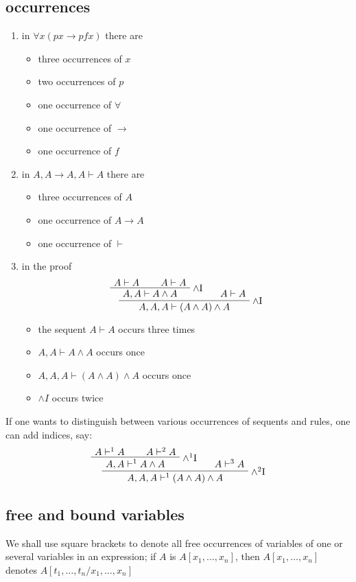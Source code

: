 \documentclass[11pt]{article}
\def \EBA {\EnableBpAbbreviations}
\def \RL[#1]{\RightLabel{#1}}
\begin{document}
\subsection{occurrences}
\label{sec:org430d477}
\begin{enumerate}
\item in \(\forall x(px\to pfx)\) there are
\begin{itemize}
\item three occurrences of \(x\)
\item two occurrences of \(p\)
\item one occurrence of \(\forall\)
\item one occurrence of \(\to\)
\item one occurrence of \(f\)
\end{itemize}
\item in \(A,A\to A,A\vdash A\) there are
\begin{itemize}
\item three occurrences of \(A\)
\item one occurrence of \(A\to A\)
\item one occurrence of \(\vdash\)
\end{itemize}
\item in the proof
\begin{gather*}
\EBA\AXC{$A\vdash A$}
\AXC{$A\vdash A$}\RL{$\wedge$I}
\BIC{$A,A\vdash A\wedge A$}
\AXC{$A\vdash A$}\RL{$\wedge$I}
\BIC{$A,A,A\vdash(A\wedge A)\wedge A$}\DP
\end{gather*}
\begin{itemize}
\item the sequent \(A\vdash A\) occurs three times
\item \(A,A\vdash A\wedge A\) occurs once
\item \(A,A,A\vdash(A\wedge A)\wedge A\) occurs once
\item \(\wedge I\) occurs twice
\end{itemize}
\end{enumerate}


If one wants to distinguish between various occurrences of sequents and rules,
one can add indices, say:
\begin{gather*}
\EBA\AXC{$A\vdash^1 A$}
\AXC{$A\vdash^2 A$}\RL{$\wedge^1$I}
\BIC{$A,A\vdash^1 A\wedge A$}
\AXC{$A\vdash^3 A$}\RL{$\wedge^2$I}
\BIC{$A,A,A\vdash^1(A\wedge A)\wedge A$}\DP
\end{gather*}
\subsection{free and bound variables}
\label{sec:orgc584d54}
We shall use square brackets to denote all free occurrences of variables of one
or several variables in an expression; if \(A\) is \(A[x_1,\dots,x_n]\), then
\(A[x_1,\dots,x_n]\) denotes \(A[t_1,\dots,t_n/x_1,\dots,x_n]\)
\end{document}
